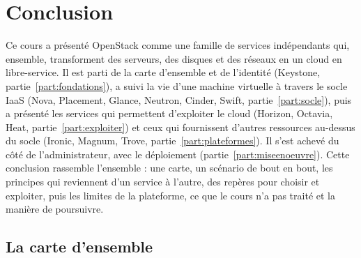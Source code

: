 
\section*{Conclusion}

\setcounter{figure}{0}\setcounter{table}{0}
\renewcommand{\thefigure}{C.\arabic{figure}}\renewcommand{\thetable}{C.\arabic{table}}
\renewcommand{\theHfigure}{C.\arabic{figure}}\renewcommand{\theHtable}{C.\arabic{table}}

Ce cours a présenté OpenStack comme une famille de services indépendants qui, ensemble, transforment des serveurs, des disques et
des réseaux en un cloud en libre-service. Il est parti de la carte d'ensemble et de l'identité (Keystone, partie~\ref{part:fondations}),
a suivi la vie d'une machine virtuelle à travers le socle IaaS (Nova, Placement, Glance, Neutron, Cinder, Swift,
partie~\ref{part:socle}), puis a présenté les services qui permettent d'exploiter le cloud (Horizon, Octavia, Heat,
partie~\ref{part:exploiter}) et ceux qui fournissent d'autres ressources au-dessus du socle (Ironic, Magnum, Trove,
partie~\ref{part:plateformes}). Il s'est achevé du côté de l'administrateur, avec le déploiement (partie~\ref{part:miseenoeuvre}). Cette conclusion rassemble l'ensemble : une carte,
un scénario de bout en bout, les principes qui reviennent d'un service à l'autre, des repères pour choisir et exploiter, puis les
limites de la plateforme, ce que le cours n'a pas traité et la manière de poursuivre.

\subsection*{La carte d'ensemble}

